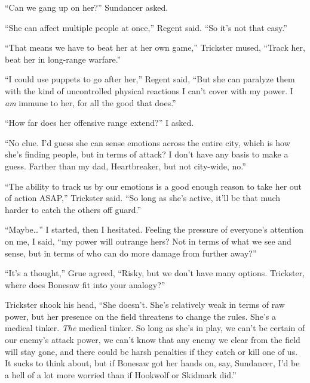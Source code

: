 ``Can we gang up on her?'' Sundancer asked.



``She can affect multiple people at once,'' Regent said.  ``So it's not that easy.''



``That means we have to beat her at her own game,'' Trickster mused, ``Track her, beat her in long-range warfare.''



``I could use puppets to go after her,'' Regent said, ``But she can paralyze them with the kind of uncontrolled physical reactions I can't cover with my power.  I \emph{am} immune to her, for all the good that does.''



``How far does her offensive range extend?'' I asked.



``No clue.  I'd guess she can sense emotions across the entire city, which is how she's finding people, but in terms of attack? I don't have any basis to make a guess.  Farther than my dad, Heartbreaker, but not city-wide, no.''



``The ability to track us by our emotions is a good enough reason to take her out of action ASAP,'' Trickster said.  ``So long as she's active, it'll be that much harder to catch the others off guard.''



``Maybe\ldots'' I started, then I hesitated.  Feeling the pressure of everyone's attention on me, I said, ``\ldotsMaybe my power will outrange hers?  Not in terms of what we see and sense, but in terms of who can do more damage from further away?''



``It's a thought,'' Grue agreed, ``Risky, but we don't have many options.  Trickster, where does Bonesaw fit into your analogy?''



Trickster shook his head, ``She doesn't.  She's relatively weak in terms of raw power, but her presence on the field threatens to change the rules.  She's a medical tinker.  \emph{The} medical tinker.  So long as she's in play, we can't be certain of our enemy's attack power, we can't know that any enemy we clear from the field will stay gone, and there could be harsh penalties if they catch or kill one of us.  It sucks to think about, but if Bonesaw got her hands on, say, Sundancer, I'd be a hell of a lot more worried than if Hookwolf or Skidmark did.''



